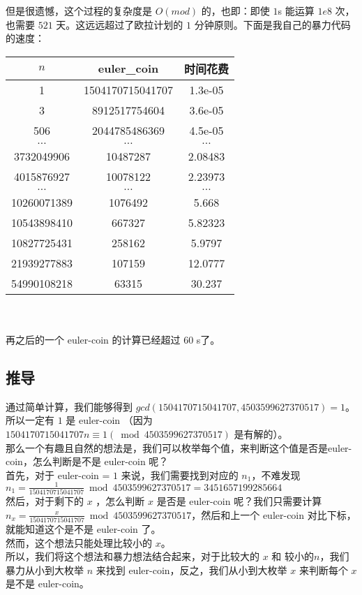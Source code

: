 \documentclass{article}
\begin{document}
\begin{CJK}{UTF8}{gbsn}
但是很遗憾，这个过程的复杂度是 $O(mod)$ 的，也即：即使 $1$s 能运算 $1e8$ 次，也需要 $521$ 天。这远远超过了欧拉计划的 $1$ 分钟原则。下面是我自己的暴力代码的速度：\\
\thispagestyle{empty}
\begin{tabular}{|c|c|c|}
\hline  
$n$&euler\_coin&时间花费\\
\hline 
1&1504170715041707&1.3e-05\\
\hline
3&8912517754604&3.6e-05\\
\hline
506&2044785486369&4.5e-05\\
\hline
$\dots$&$\dots$&$\dots$\\
\hline
3732049906&10487287&2.08483\\
\hline
4015876927&10078122&2.23973\\
\hline
$\dots$&$\dots$&$\dots$\\
\hline
10260071389&1076492&5.668\\
\hline
10543898410&667327&5.82323\\
\hline
10827725431&258162&5.9797\\
\hline
21939277883&107159&12.0777\\
\hline
54990108218&63315&30.237\\
\hline
\end{tabular}\\\\

再之后的一个 euler-coin 的计算已经超过 $60$ s了。

\subsection{推导}

通过简单计算，我们能够得到 $gcd(1504170715041707, 4503599627370517) = 1$。所以一定有 $1$ 是 euler-coin （因为 $1504170715041707n \equiv 1 (\bmod 4503599627370517)$ 是有解的）。 \\

那么一个有趣且自然的想法是，我们可以枚举每个值，来判断这个值是否是euler-coin，怎么判断是不是 euler-coin 呢？\\

首先，对于 euler-coin = $1$ 来说，我们需要找到对应的 $n_1$，不难发现 $n_1 = \frac{1}{1504170715041707} \bmod 4503599627370517 = 3451657199285664$\\

然后，对于剩下的 $x$ ，怎么判断 $x$ 是否是 euler-coin 呢？我们只需要计算 $n_x = \frac{x}{1504170715041707} \bmod 4503599627370517$，然后和上一个 euler-coin 对比下标，就能知道这个是不是 euler-coin 了。\\

然而，这个想法只能处理比较小的 $x$。\\

所以，我们将这个想法和暴力想法结合起来，对于比较大的 $x$ 和 较小的$n$，我们暴力从小到大枚举 $n$ 来找到 euler-coin，反之，我们从小到大枚举 $x$ 来判断每个 $x$ 是不是 euler-coin。

\end{CJK}
\end{document}
